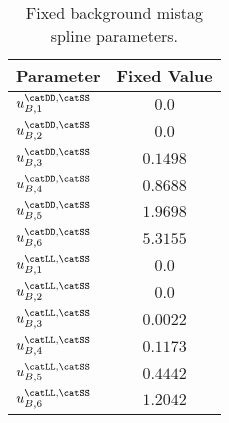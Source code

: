 %
\begin{table}[h]
\caption{Fixed background \SSpi mistag spline parameters.}
\label{tab:app:measurement_of_sin2beta:cpv_measurement:fixed_parameters:eta:bkg:ss}
\centering
\begin{tabular}{lr@{$\,\pm\,$}l}
  \toprule
  Parameter                     & \multicolumn{2}{c}{Fixed Value} \\
  \midrule
  $u_{B,1}^\text{\catDD,\catSS}$ & \multicolumn{2}{c}{$0.0$}\\
  $u_{B,2}^\text{\catDD,\catSS}$ & \multicolumn{2}{c}{$0.0$}\\
  $u_{B,3}^\text{\catDD,\catSS}$ & \multicolumn{2}{c}{$0.1498$}\\
  $u_{B,4}^\text{\catDD,\catSS}$ & \multicolumn{2}{c}{$0.8688$}\\
  $u_{B,5}^\text{\catDD,\catSS}$ & \multicolumn{2}{c}{$1.9698$}\\
  $u_{B,6}^\text{\catDD,\catSS}$ & \multicolumn{2}{c}{$5.3155$}\\
  $u_{B,1}^\text{\catLL,\catSS}$ & \multicolumn{2}{c}{$0.0$}\\
  $u_{B,2}^\text{\catLL,\catSS}$ & \multicolumn{2}{c}{$0.0$}\\
  $u_{B,3}^\text{\catLL,\catSS}$ & \multicolumn{2}{c}{$0.0022$}\\
  $u_{B,4}^\text{\catLL,\catSS}$ & \multicolumn{2}{c}{$0.1173$}\\
  $u_{B,5}^\text{\catLL,\catSS}$ & \multicolumn{2}{c}{$0.4442$}\\
  $u_{B,6}^\text{\catLL,\catSS}$ & \multicolumn{2}{c}{$1.2042$}\\
  \bottomrule
\end{tabular}
\end{table}
%

